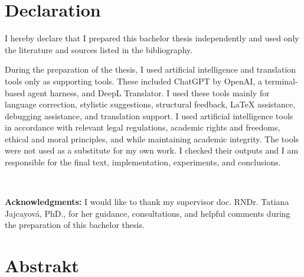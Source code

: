 \documentclass[12pt, twoside]{book}
\begin{document}



\newpage
\chapter*{Declaration}

I hereby declare that I prepared this bachelor thesis independently and used
only the literature and sources listed in the bibliography.

During the preparation of the thesis, I used artificial intelligence and
translation tools only as supporting tools. These included ChatGPT by OpenAI, a terminal-based agent harness, and DeepL Translator. I used these tools mainly
for language correction, stylistic suggestions, structural feedback, LaTeX
assistance, debugging assistance, and translation support. I used artificial
intelligence tools in accordance with relevant legal regulations, academic
rights and freedoms, ethical and moral principles, and while maintaining
academic integrity. The tools were not used as a substitute for my own work. I
checked their outputs and I am responsible for the final text, implementation,
experiments, and conclusions.

\newpage
\pagestyle{plain}
~

\vfill
{\bf Acknowledgments:} I would like to thank my supervisor doc. RNDr. Tatiana Jajcayová, PhD.,
for her guidance, consultations, and helpful comments during the preparation of
this bachelor thesis.


\newpage 
\chapter*{Abstrakt}
\end{document}
